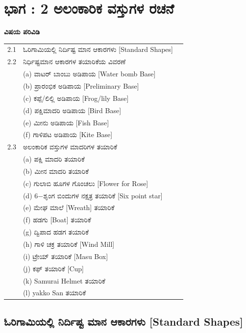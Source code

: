 

\chapter{ಭಾಗ :  2 ಅಲಂಕಾರಿಕ ವಸ್ತುಗಳ ರಚನೆ}\label{chap2}

\textbf{\Large ವಿಷಯ ಪರಿವಿಡಿ}

\medskip
\medskip

{%
\begin{longtable}[l]{@{}>{}r>{\raggedright}p{9.1cm}>{}r@{}}
\hline
2.1 & ಓರಿಗಾಮಿಯಲ್ಲಿ ನಿರ್ದಿಷ್ಟ ಮಾನ ಆಕಾರಗಳು [Standard Shapes] \dotfill & \pageref{sec2.1}\\
2.2 & ನಿರ್ಧಿಷ್ಟಮಾನ ಆಕಾರಗಳ ತಯಾರಿಕೆಯ ವಿವರಣೆ \dotfill & {\pageref{sec2.2}}\\
& (a) ವಾಟರ್ ಬಾಂಬು ಅಡಿಪಾಯ [Water bomb Base] & \\
& (b) ಪ್ರಾರಂಭಿಕ ಅಡಿಪಾಯ [Preliminary Base] &\\
& (c) ಕಪ್ಪೆ/ಲಿಲ್ಲಿ ಅಡಿಪಾಯ [Frog/lily Base]&\\
& (d) ಪಕ್ಷಿಮಾದರಿ ಅಡಿಪಾಯ [Bird Base] & \\
& (e) ಮೀನು ಅಡಿಪಾಯ [Fish Base]  &\\
& (f) ಗಾಳಿಪಟ ಅಡಿಪಾಯ  [Kite Base]  & \\
2.3 & ಅಲಂಕಾರಿಕ ವಸ್ತುಗಳ ಮಾದರಿಗಳ ತಯಾರಿಕೆ \dotfill & \pageref{sec2.3}\\
& (a) ಪಕ್ಷಿ ಮಾದರಿ ತಯಾರಿಕೆ & \\
& (b) ಮೀನ ಮಾದರಿ ತಯಾರಿಕೆ  & \\
& (c) ಗುಲಾಬಿ ಹೂಗಳ ಗೊಂಚಲು [Flower for Rose] & \\
& (d) 6$-$ಶೃಂಗ ಬಿಂದುಗಳ ನಕ್ಷತ್ರ ತಯಾರಿಕೆ [Six point star] & \\
& (e) ಮೇಘ ಮಾಲೆ [Wreath] ತಯಾರಿಕೆ & \\
& (f)  ಹಡಗು [Boat] ತಯಾರಿಕೆ & \\
& (g) ದ್ವಿಪಾದ ಹಡಗ ತಯಾರಿಕೆ & \\
& (h) ಗಾಳಿ ಚಕ್ರ ತಯಾರಿಕೆ  [Wind Mill]& \\
& (i) ಟ್ರೇಯ್ ತಯಾರಿಕೆ [Masu Box]& \\
& (j) ಕಫ್ ತಯಾರಿಕೆ  [Cup]& \\
& (k) Samurai Helmet ತಯಾರಿಕೆ & \\
& (l) yakko San ತಯಾರಿಕೆ  & \\
\hline
\end{longtable}}\relax

\bigskip

 
 \section{ಓರಿಗಾಮಿಯಲ್ಲಿ ನಿರ್ದಿಷ್ಟ ಮಾನ ಆಕಾರಗಳು [Standard Shapes]}\label{sec2.1}%
 
